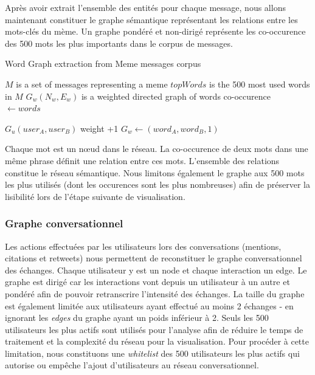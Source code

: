     Après avoir extrait l'ensemble des entités pour chaque message, nous allons maintenant constituer le graphe sémantique représentant les relations entre les mots-clés du mème. Un graphe pondéré et non-dirigé représente les co-occurence des 500 mots les plus importants dans le corpus de messages.

    \begin{algorithm}[h]
        \caption{Word Graph extraction from Meme messages corpus}
        \label{algo:meme-graph}
        \begin{algorithmic}

            \Require $M$ is a set of messages representing a meme
            \State $topWords$ is the 500 most used words in $M$
            \State $G_w(N_w,E_w)$ is a weighted directed graph of words co-occurence
            \\
                    \State {}  $ \gets words$

                                \State $G_u(user_A,user_B)$ weight +1
                            \Else
                                \State $G_w \gets (word_A,word_B, 1)$
                            \EndIf
                        \EndFor
                    \EndIf
                \EndFor
            \EndFunction
        \end{algorithmic}
    \end{algorithm}

    Chaque mot est un nœud dans le réseau. La co-occurence de deux mots dans une même phrase définit une relation entre ces mots. L{\textquoteright}ensemble des relations constitue le réseau sémantique. Nous limitons également le graphe aux 500 mots les plus utilisés (dont les occurences sont les plus nombreuses) afin de préserver la lisibilité lors de l'étape suivante de visualisation.

\subsubsection[Graphe conversationnel]{Graphe conversationnel}

    Les actions effectuées par les utilisateurs lors des conversations (mentions, citations et retweets) nous permettent de reconstituer le graphe conversationnel des échanges. Chaque utilisateur y est un node et chaque interaction un edge. Le graphe est dirigé car les interactions vont depuis un utilisateur à un autre et pondéré afin de pouvoir retranscrire l'intensité des échanges. La taille du graphe est également limitée aux utilisateurs ayant effectué au moins 2 échanges - en ignorant les \textit{edges} du graphe ayant un poids inférieur à 2. Seuls les 500 utilisateurs les plus actifs sont utilisés pour l'analyse afin de réduire le temps de traitement et la complexité du réseau pour la visualisation. Pour procéder à cette limitation, nous constituons une \textit{whitelist} des 500 utilisateurs les plus actifs qui autorise ou empêche l'ajout d'utilisateurs au réseau conversationnel.

